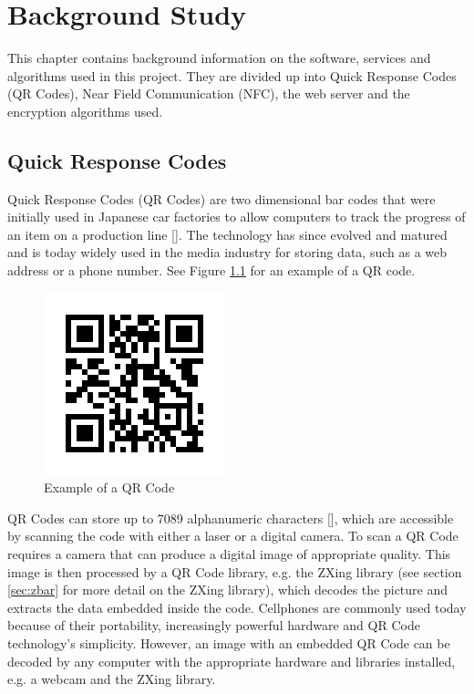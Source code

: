 \chapter{Background Study}

This chapter contains background information on the software, services and algorithms used
in this project. They are divided up into Quick Response Codes (QR Codes), Near Field
Communication (NFC), the web server and the encryption algorithms used.

\section{Quick Response Codes}

 Quick Response Codes (QR Codes) are two dimensional bar codes that were initially
 used in Japanese car factories to allow computers to track the progress of
 an item on a production line [\cite{journal:qr-code}]. The technology has
 since evolved and matured and is today widely used in the media industry for storing
 data, such as a web address or a phone number. See Figure \ref{qrcode} for an example of
 a QR code.
 
\begin{figure}
\centering
\includegraphics[scale = 0.7]{qrcode_voorbeeld.png}
\caption{Example of a QR Code}
\label{qrcode}
\end{figure}
 
 QR Codes can store up to 7089 alphanumeric characters [\cite{journal:qr-code}], which are
 accessible by scanning the code with either a laser or a digital camera. To scan a QR Code
 requires a camera that can produce a digital image of appropriate quality. This image is then
 processed by a QR Code library, e.g.
 the ZXing library (see section \ref{sec:zbar} for more detail on the ZXing library),
 which decodes the picture and extracts the data embedded inside the code. Cellphones are
 commonly used today because of their portability, increasingly powerful hardware and QR
 Code technology's simplicity.
 However, an image with an embedded QR Code can be decoded by any computer with the
 appropriate hardware and libraries installed, e.g. a webcam and the ZXing library.

